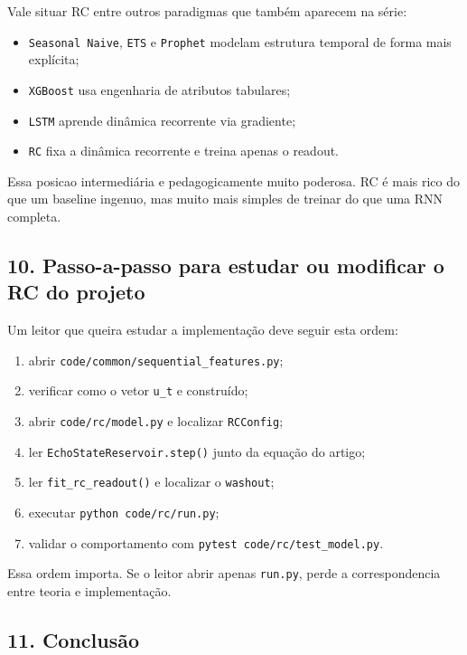 \documentclass[12pt]{article}
\providecommand{\tightlist}{%
          \setlength{\itemsep}{0pt}\setlength{\parskip}{0pt}}
\begin{document}
Vale situar RC entre outros paradigmas que também aparecem na série:

\begin{itemize}
\tightlist
\item
  \texttt{Seasonal\ Naive}, \texttt{ETS} e \texttt{Prophet} modelam estrutura temporal de forma mais explícita;
\item
  \texttt{XGBoost} usa engenharia de atributos tabulares;
\item
  \texttt{LSTM} aprende dinâmica recorrente via gradiente;
\item
  \texttt{RC} fixa a dinâmica recorrente e treina apenas o readout.
\end{itemize}

Essa posicao intermediária e pedagogicamente muito poderosa. RC é mais rico do que um baseline ingenuo, mas muito mais simples de treinar do que uma RNN completa.

\subsection{10. Passo-a-passo para estudar ou modificar o RC do projeto}\label{10-passo-a-passo-para-estudar-ou-modificar-o-rc-do-projeto}

Um leitor que queira estudar a implementação deve seguir esta ordem:

\begin{enumerate}
\def\labelenumi{\arabic{enumi}.}
\tightlist
\item
  abrir \texttt{code/common/sequential\_features.py};
\item
  verificar como o vetor \texttt{u\_t} e construído;
\item
  abrir \texttt{code/rc/model.py} e localizar \texttt{RCConfig};
\item
  ler \texttt{EchoStateReservoir.step()} junto da equação do artigo;
\item
  ler \texttt{fit\_rc\_readout()} e localizar o \texttt{washout};
\item
  executar \texttt{python\ code/rc/run.py};
\item
  validar o comportamento com \texttt{pytest\ code/rc/test\_model.py}.
\end{enumerate}

Essa ordem importa. Se o leitor abrir apenas \texttt{run.py}, perde a correspondencia entre teoria e implementação.

\subsection{11. Conclusão}\label{11-conclusuxe3o}
\end{document}
